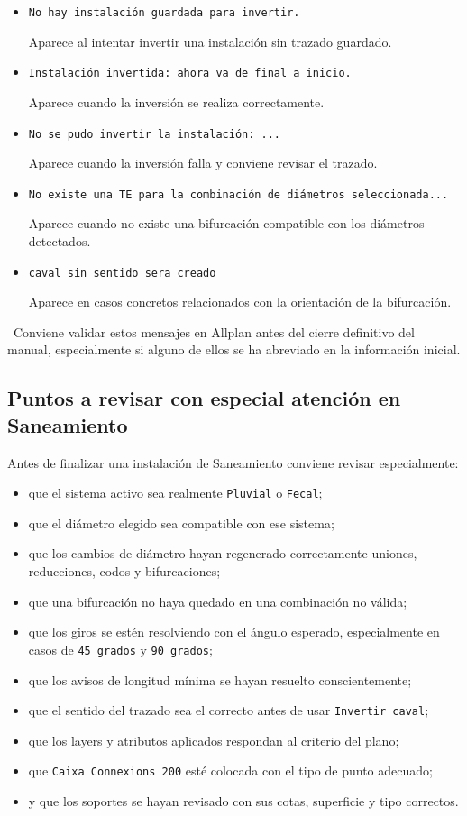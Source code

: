 \begin{itemize}
\item \texttt{No hay instalación guardada para invertir.}

Aparece al intentar invertir una instalación sin trazado guardado.

\item \texttt{Instalación invertida: ahora va de final a inicio.}

Aparece cuando la inversión se realiza correctamente.

\item \texttt{No se pudo invertir la instalación: ...}

Aparece cuando la inversión falla y conviene revisar el trazado.

\item \texttt{No existe una TE para la combinación de diámetros seleccionada...}

Aparece cuando no existe una bifurcación compatible con los diámetros detectados.

\item \texttt{caval sin sentido sera creado}

Aparece en casos concretos relacionados con la orientación de la bifurcación.
\end{itemize}

\pendingtag\ Conviene validar estos mensajes en Allplan antes del cierre definitivo del manual, especialmente si alguno de ellos se ha abreviado en la información inicial.

\subsection{Puntos a revisar con especial atención en Saneamiento}

Antes de finalizar una instalación de Saneamiento conviene revisar especialmente:

\begin{itemize}
\item que el sistema activo sea realmente \texttt{Pluvial} o \texttt{Fecal};
\item que el diámetro elegido sea compatible con ese sistema;
\item que los cambios de diámetro hayan regenerado correctamente uniones, reducciones, codos y bifurcaciones;
\item que una bifurcación no haya quedado en una combinación no válida;
\item que los giros se estén resolviendo con el ángulo esperado, especialmente en casos de \texttt{45 grados} y \texttt{90 grados};
\item que los avisos de longitud mínima se hayan resuelto conscientemente;
\item que el sentido del trazado sea el correcto antes de usar \texttt{Invertir caval};
\item que los layers y atributos aplicados respondan al criterio del plano;
\item que \texttt{Caixa Connexions 200} esté colocada con el tipo de punto adecuado;
\item y que los soportes se hayan revisado con sus cotas, superficie y tipo correctos.
\end{itemize}

